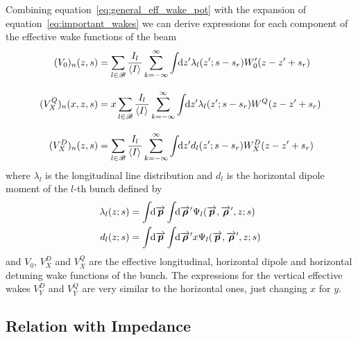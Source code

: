     Combining equation~\eqref{eq:general_eff_wake_pot} with the expansion of equation~\eqref{eq:important_wakes} we can derive expressions for each component of the effective wake functions of the beam
    \begin{subequations}\label{eq:general_eff_wakes}
    \begin{align}\label{eq:general_eff_long_wake}
	  	(V_0)_n(z, s) &= \sum_{l\in\mathscr{B}}\frac{I_l}{\left\langle I \right\rangle_{{}}}\sum_{k=-\infty}^\infty\int\!\!\text{d}z' \lambda_l(z'; s - s_r)W'_0(z - z' + s_r)
        \\[3mm]\label{eq:general_eff_quad_wake}
	  	(V^Q_X)_n(x, z, s) &= x\sum_{l\in\mathscr{B}}\frac{I_l}{\left\langle I \right\rangle_{{}}}\sum_{k=-\infty}^\infty\int\!\!\text{d}z' \lambda_l(z'; s - s_r)W^Q(z-z' + s_r)
        \\[3mm]\label{eq:general_eff_dip_wake}
	  	(V^D_X)_n(z, s) &= \sum_{l\in\mathscr{B}}\frac{I_l}{\left\langle I \right\rangle_{{}}}\sum_{k=-\infty}^\infty\int\!\!\text{d}z' d_l(z'; s - s_r)W^D_X(z-z' + s_r)
    \end{align}
    \end{subequations}
    where $\lambda_l$ is the longitudinal line distribution and $d_l$ is the horizontal dipole moment of the $l$-th bunch defined by
    \begin{align}\label{eq:definition_long_distributions}
	  	\lambda_l(z; s) = \udefint{\vect{p}}{\udefint{\vect{\rho}'}{
	  			&\Psi_l(\vect{p},\vect{\rho}',z; s)}}\\
	  	d_l(z; s) = \udefint{\vect{p}}{\udefint{\vect{\rho}'}{
	  			&x\Psi_l(\vect{p},\vect{\rho}',z; s)}}
    \end{align}
    and $V_0$, $V^D_X$ and $V^Q_X$ are the effective longitudinal, horizontal dipole and horizontal detuning wake functions of the bunch. The expressions for the vertical effective wakes $V^D_Y$ and $V^Q_Y$ are very similar to the horizontal ones, just changing $x$ for $y$.

\subsection{Relation with Impedance}\label{ssec:relation_with_impedance}

